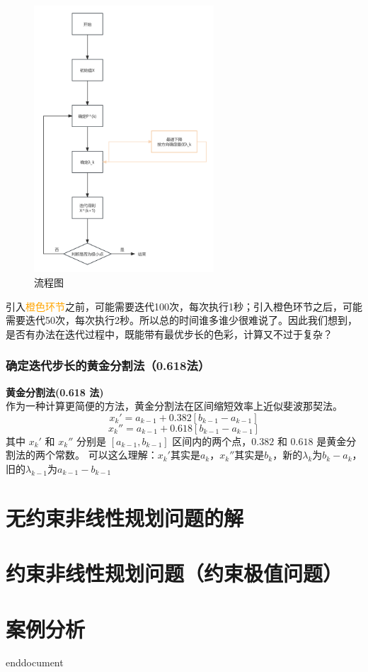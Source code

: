 \begin{figure}[H]
    \centering
    \includegraphics[width=0.6\textwidth]{./image/23.png}
    \caption{流程图}
    \label{fig:Chapter4_Temporary_Pavilion_1}
\end{figure}
引入\textcolor{orange}{橙色环节}之前，可能需要迭代100次，每次执行1秒；引入橙色环节之后，可能需要迭代50次，每次执行2秒。所以总的时间谁多谁少很难说了。因此我们想到，是否有办法在迭代过程中，既能带有最优步长的色彩，计算又不过于复杂？
\subsubsection{确定迭代步长的黄金分割法（0.618法）}
\label{确定迭代步长的黄金分割法（0.618法）}
\begin{notebox}{\textbf{黄金分割法(0.618 法)}}{}
    \\作为一种计算更简便的方法，黄金分割法在区间缩短效率上近似斐波那契法。
    \[
    x_k' = a_{k-1} + 0.382 [b_{k-1} - a_{k-1}]
    \]
    \[
    x_k'' = a_{k-1} + 0.618 [b_{k-1} - a_{k-1}]
    \]
    其中 $x_k'$ 和 $x_k''$ 分别是 $[a_{k-1}, b_{k-1}]$ 区间内的两个点，$0.382$ 和 $0.618$ 是黄金分割法的两个常数。
    可以这么理解：$x_k'$其实是$a_k$，$x_k''$其实是$b_k$，新的$\lambda_k$为$b_{k}-a_{k}$，旧的$\lambda_{k-1}$为$a_{k-1}-b_{k-1}$ 
\end{notebox}

\section{无约束非线性规划问题的解}
    \section{约束非线性规划问题（约束极值问题）}
    \section{案例分析}


\ifx\allfiles\undefined
	
	
	
	end{document}
	\else
	\fi